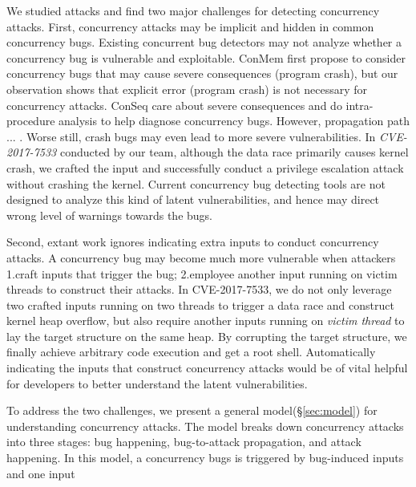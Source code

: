 We studied \nattacks attacks and find two major challenges for detecting concurrency attacks. 
First, concurrency attacks may be implicit and hidden in common concurrency bugs. 
Existing concurrent bug detectors may not 
analyze whether a concurrency bug is vulnerable and exploitable.  
ConMem\cite{conmem:asplos10} first propose to 
consider concurrency bugs that may cause severe consequences (\eg program crash), 
but our observation shows that explicit error (\eg program crash) is not necessary for concurrency 
attacks.
ConSeq\cite{conseq:asplos11} care about severe consequences and do intra-procedure analysis to help diagnose concurrency bugs. 
However, propagation path ... .
%
Worse still, crash bugs may even lead to more severe vulnerabilities. 
In \emph{CVE-2017-7533} conducted by our team, although the data race primarily causes kernel crash, 
we crafted the input and successfully conduct a privilege escalation attack without crashing the kernel.
Current concurrency bug detecting tools are not designed to analyze this kind of latent vulnerabilities, 
and hence may direct wrong level of warnings towards the bugs.  


Second, extant work ignores indicating extra inputs to conduct concurrency attacks.
A concurrency bug may become much more vulnerable when attackers 1.craft inputs that trigger the bug; 
2.employee another input running on victim threads to construct their attacks. 
In CVE-2017-7533, we do not only leverage two crafted inputs running on two threads to trigger a data race and construct kernel heap overflow, 
but also require another inputs running on \emph{victim thread} to lay the target structure on the same heap. 
By corrupting the target structure, we finally achieve arbitrary code execution and get a root shell. 
Automatically indicating the inputs that construct concurrency attacks 
would be of vital helpful for developers to better understand the latent vulnerabilities.


To address the two challenges, we present a general model(\S\ref{sec:model}) 
for understanding concurrency attacks.
The model breaks down concurrency attacks into three stages: bug happening, 
bug-to-attack propagation, and attack happening. In this model, 
a concurrency bugs is triggered by bug-induced inputs and one input 



